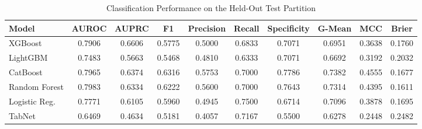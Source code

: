 \begin{table}
\centering
\caption{Classification Performance on the Held-Out Test Partition}
\label{tab:results}
\begin{tabular}{lccccccccc}
\toprule
Model & AUROC & AUPRC & F1 & Precision & Recall & Specificity & G-Mean & MCC & Brier \\
\midrule
XGBoost & 0.7906 & 0.6606 & 0.5775 & 0.5000 & 0.6833 & 0.7071 & 0.6951 & 0.3638 & 0.1760 \\
LightGBM & 0.7483 & 0.5663 & 0.5468 & 0.4810 & 0.6333 & 0.7071 & 0.6692 & 0.3192 & 0.2032 \\
CatBoost & 0.7965 & 0.6374 & 0.6316 & 0.5753 & 0.7000 & 0.7786 & 0.7382 & 0.4555 & 0.1677 \\
Random Forest & 0.7983 & 0.6334 & 0.6222 & 0.5600 & 0.7000 & 0.7643 & 0.7314 & 0.4395 & 0.1611 \\
Logistic Reg. & 0.7771 & 0.6105 & 0.5960 & 0.4945 & 0.7500 & 0.6714 & 0.7096 & 0.3878 & 0.1695 \\
TabNet & 0.6469 & 0.4634 & 0.5181 & 0.4057 & 0.7167 & 0.5500 & 0.6278 & 0.2448 & 0.2482 \\
\bottomrule
\end{tabular}
\end{table}
